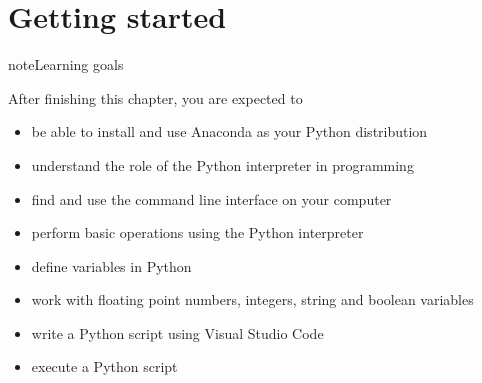 \documentclass[letterpaper,10pt,english]{jupyterBook}
\begin{document}
\chapter{Getting started}
\label{\detokenize{notebooks/01_GettingStarted/01_GettingStarted_student:getting-started}}\label{\detokenize{notebooks/01_GettingStarted/01_GettingStarted_student::doc}}
\begin{sphinxadmonition}{note}{Learning goals}

\sphinxAtStartPar
After finishing this chapter, you are expected to
\begin{itemize}
\item {} 
\sphinxAtStartPar
be able to install and use Anaconda as your Python distribution

\item {} 
\sphinxAtStartPar
understand the role of the Python interpreter in programming

\item {} 
\sphinxAtStartPar
find and use the command line interface on your computer

\item {} 
\sphinxAtStartPar
perform basic operations using the Python interpreter

\item {} 
\sphinxAtStartPar
define variables in Python

\item {} 
\sphinxAtStartPar
work with floating point numbers, integers, string and boolean variables

\item {} 
\sphinxAtStartPar
write a Python script using Visual Studio Code

\item {} 
\sphinxAtStartPar
execute a Python script

\end{itemize}
\end{sphinxadmonition}
\end{document}
